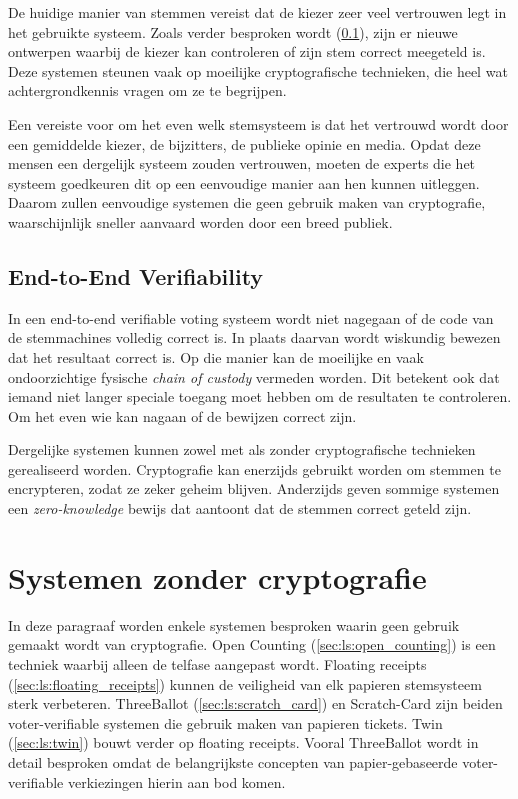 De huidige manier van stemmen vereist dat de kiezer zeer veel vertrouwen legt in het gebruikte systeem. Zoals verder besproken wordt (\ref{sec:ls:end_to_end_verifiability}), zijn er nieuwe ontwerpen waarbij de kiezer kan controleren of zijn stem correct meegeteld is. Deze systemen steunen vaak op moeilijke cryptografische technieken, die heel wat achtergrondkennis vragen om ze te begrijpen.

\npar Een vereiste voor om het even welk stemsysteem is dat het vertrouwd wordt door een gemiddelde kiezer, de bijzitters, de publieke opinie en media. Opdat deze mensen een dergelijk systeem zouden vertrouwen, moeten de experts die het systeem goedkeuren dit op een eenvoudige manier aan hen kunnen uitleggen.\cite{randell_ryan_voting_technologies_and_trust} Daarom zullen eenvoudige systemen die geen gebruik maken van cryptografie, waarschijnlijk sneller aanvaard worden door een breed publiek.

\subsection{End-to-End Verifiability}
\label{sec:ls:end_to_end_verifiability}

In een end-to-end verifiable voting systeem wordt niet nagegaan of de code van de stemmachines volledig correct is. In plaats daarvan wordt wiskundig bewezen dat het resultaat correct is. Op die manier kan de moeilijke en vaak ondoorzichtige fysische \textit{chain of custody} vermeden worden. Dit betekent ook dat iemand niet langer speciale toegang moet hebben om de resultaten te controleren. Om het even wie kan nagaan of de bewijzen correct zijn.

\npar Dergelijke systemen kunnen zowel met als zonder cryptografische technieken gerealiseerd worden. Cryptografie kan enerzijds gebruikt worden om stemmen te encrypteren, zodat ze zeker geheim blijven. Anderzijds geven sommige systemen een \textit{zero-knowledge} bewijs dat aantoont dat de stemmen correct geteld zijn.

\section{Systemen zonder cryptografie}
\label{sec:ls:systemen_zonder_cryptografie}

In deze paragraaf worden enkele systemen besproken waarin geen gebruik gemaakt wordt van cryptografie. Open Counting (\ref{sec:ls:open_counting}) is een techniek waarbij alleen de telfase aangepast wordt. Floating receipts (\ref{sec:ls:floating_receipts}) kunnen de veiligheid van elk papieren stemsysteem sterk verbeteren. ThreeBallot (\ref{sec:ls:scratch_card}) en Scratch-Card zijn beiden voter-verifiable systemen die gebruik maken van papieren tickets. Twin (\ref{sec:ls:twin}) bouwt verder op floating receipts. Vooral ThreeBallot wordt in detail besproken omdat de belangrijkste concepten van papier-gebaseerde voter-verifiable verkiezingen hierin aan bod komen.

